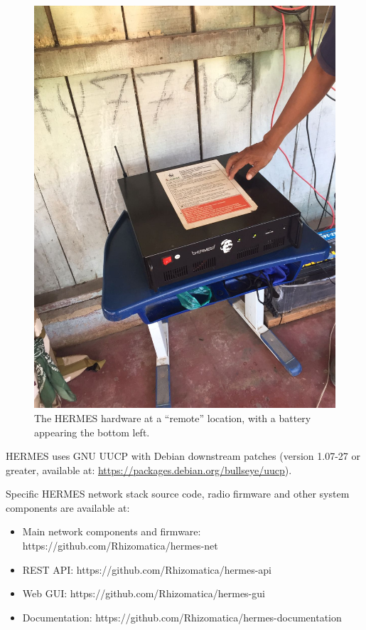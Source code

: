 \documentclass[11pt,a4paper]{article}
\begin{document}
\begin{figure}[h!]
  \centering
  \includegraphics[scale=0.15]{hermes-pic2.jpeg}
  \caption{The HERMES hardware at a ``remote'' location, with a battery appearing the bottom left.}
  \label{fig2}
\end{figure}


HERMES uses GNU UUCP with Debian downstream patches (version 1.07-27 or greater, available at: \url{https://packages.debian.org/bullseye/uucp}).

Specific HERMES network stack source code, radio firmware and other system components are available at:

\begin{itemize}
\item Main network components and firmware: https://github.com/Rhizomatica/hermes-net
\item REST API: https://github.com/Rhizomatica/hermes-api
\item Web GUI: https://github.com/Rhizomatica/hermes-gui
\item Documentation: https://github.com/Rhizomatica/hermes-documentation
\end{itemize}
\end{document}
